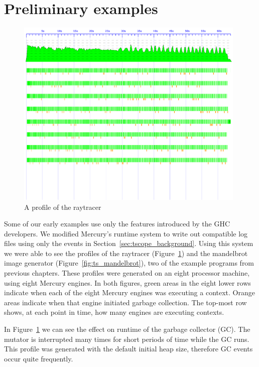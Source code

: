 \section{Preliminary examples}
\label{sec:tscope_example}

\begin{figure}
\includegraphics[width=0.98\textwidth]{pics/icfp2000_eventlog}
\caption{A profile of the raytracer}
\label{fig:ts_icfp2000}
\end{figure}

Some of our early examples use only the \tscope features introduced by the
GHC developers.
We modified Mercury's runtime system to write out compatible log files using
only the events in Section~\ref{sec:tscope_background}.
Using this system we were able to see the \tscope profiles of the raytracer
(Figure~\ref{fig:ts_icfp2000})
and the mandelbrot image generator (Figure~\ref{fig:ts_mandelbrot}),
two of the example programs from previous chapters.
These profiles were generated on an eight processor machine, using eight
Mercury engines.
In both figures, green areas in the eight lower rows indicate when each of
the eight Mercury engines was executing a context.
Orange areas indicate when that engine initiated garbage collection.
The top-most row shows, at each point in time, how many engines are
executing contexts.

In Figure~\ref{fig:ts_icfp2000} we can see the effect on runtime of the
garbage collector (GC).
The mutator is interrupted many times for short periods of time while the
GC runs.
This profile was generated with the default initial heap size,
therefore GC events occur quite frequently.

